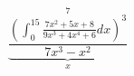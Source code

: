\documentclass[10pt,a4paper]{report}
\begin{document}
$$ \underbrace 
			  {
			   \frac{
			   		\left(
			   			 \int_{0}^{15}
			   						 \frac{7x^2+5x+8}{9x^3+4x^4+6} dx
			   		\right)^3
					}{7x^3-x^2}
			  }_x^7
$$
\end{document}
